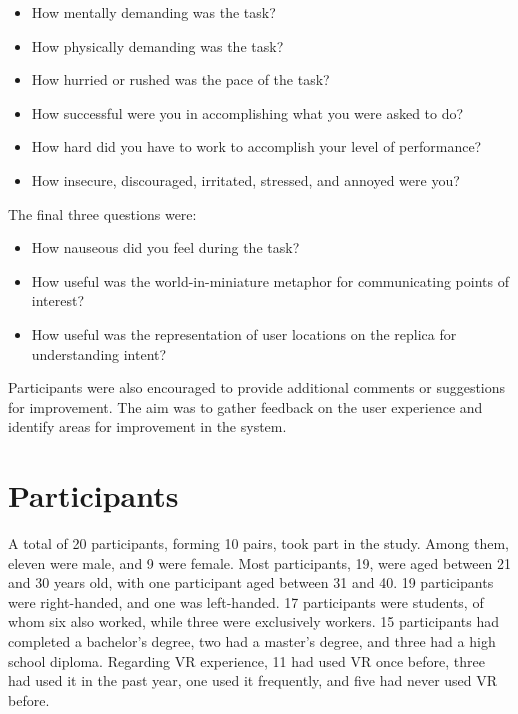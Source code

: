         \begin{itemize}
            \item How mentally demanding was the task?
            \item How physically demanding was the task?
            \item How hurried or rushed was the pace of the task?
            \item How successful were you in accomplishing what you were asked to do?
            \item How hard did you have to work to accomplish your level of performance?
            \item How insecure, discouraged, irritated, stressed, and annoyed were you?
        \end{itemize}

        The final three questions were:

        \begin{itemize}
            \item How nauseous did you feel during the task?
            \item How useful was the world-in-miniature metaphor for communicating points of interest?
            \item How useful was the representation of user locations on the replica for understanding intent?
        \end{itemize}

        Participants were also encouraged to provide additional comments or suggestions for improvement. The aim was to gather feedback on the user experience and identify areas for improvement in the system.

\section{Participants}

    A total of 20 participants, forming 10 pairs, took part in the study. Among them, eleven were male, and 9 were female. Most participants, 19, were aged between 21 and 30 years old, with one participant aged between 31 and 40. 19 participants were right-handed, and one was left-handed. 17 participants were students, of whom six also worked, while three were exclusively workers. 15 participants had completed a bachelor's degree, two had a master's degree, and three had a high school diploma. Regarding VR experience, 11 had used VR once before, three had used it in the past year, one used it frequently, and five had never used VR before.

